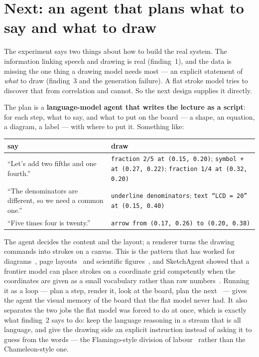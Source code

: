 \documentclass[11pt]{article}
\begin{document}
\section{Next: an agent that plans what to say and what to draw}

The experiment says two things about how to build the real system. The information linking speech and drawing is real (finding~1), and the data is missing the one thing a drawing model needs most --- an explicit statement of \emph{what} to draw (finding~3 and the generation failure). A flat stroke model tries to discover that from correlation and cannot. So the next design supplies it directly.

The plan is a \textbf{language-model agent that writes the lecture as a script}: for each step, what to say, and what to put on the board --- a shape, an equation, a diagram, a label --- with where to put it. Something like:

\begin{center}
\small
\begin{tabular}{@{}l l@{}}
\toprule
say & draw \\
\midrule
``Let's add two fifths and one fourth.'' & \texttt{fraction 2/5 at (0.15, 0.20)}; \texttt{symbol + at (0.27, 0.22)}; \texttt{fraction 1/4 at (0.32, 0.20)} \\
``The denominators are different, so we need a common one.'' & \texttt{underline denominators}; \texttt{text ``LCD = 20'' at (0.15, 0.40)} \\
``Five times four is twenty.'' & \texttt{arrow from (0.17, 0.26) to (0.20, 0.38)} \\
\bottomrule
\end{tabular}
\end{center}

The agent decides the content and the layout; a renderer turns the drawing commands into strokes on a canvas. This is the pattern that has worked for diagrams~\citep{zala2024diagrammergpt}, page layouts~\citep{feng2023layoutgpt} and scientific figures~\citep{belouadi2024automatikz}, and SketchAgent showed that a frontier model can place strokes on a coordinate grid competently when the coordinates are given as a small vocabulary rather than raw numbers~\citep{vinker2024sketchagent}. Running it as a loop --- plan a step, render it, look at the board, plan the next~\citep{yao2023react} --- gives the agent the visual memory of the board that the flat model never had. It also separates the two jobs the flat model was forced to do at once, which is exactly what finding~2 says to do: keep the language reasoning in a stream that is all language, and give the drawing side an explicit instruction instead of asking it to guess from the words --- the Flamingo-style division of labour~\citep{alayrac2022flamingo} rather than the Chameleon-style one.
\end{document}
